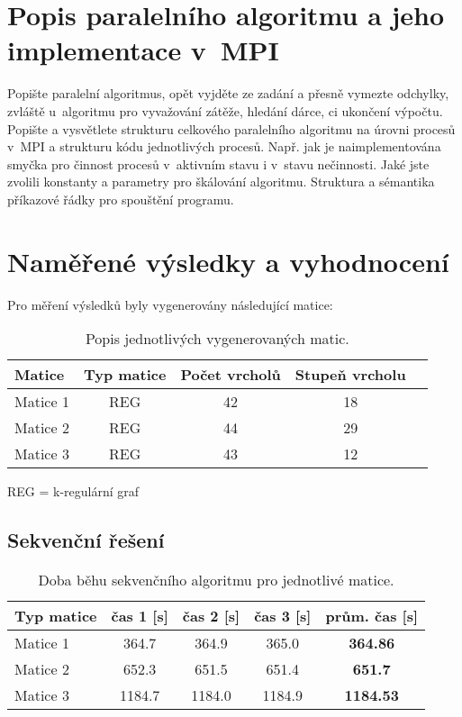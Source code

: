 \documentclass[12pt]{article}
\begin{document}
\section{Popis paralelního algoritmu a jeho implementace v~MPI}

Popište paralelní algoritmus, opět vyjděte ze zadání a přesně
vymezte odchylky, zvláště u~algoritmu pro vyvažování zátěže, hledání
dárce, ci ukončení výpočtu.  Popište a vysvětlete strukturu
celkového paralelního algoritmu na úrovni procesů v~MPI a strukturu
kódu jednotlivých procesů. Např. jak je naimplementována smyčka pro
činnost procesů v~aktivním stavu i v~stavu nečinnosti. Jaké jste
zvolili konstanty a parametry pro škálování algoritmu. Struktura a
sémantika příkazové řádky pro spouštění programu.

\section{Naměřené výsledky a vyhodnocení}

Pro měření výsledků byly vygenerovány následující matice:
\begin{table}[ht]
\centering
\begin{tabular}{|l|c|c|c|c|}
\hline \textbf{Matice} & \textbf{Typ matice} & \textbf{Počet vrcholů} & \textbf{Stupeň vrcholu} \\
\hline 
\hline Matice 1 & REG & 42 & 18 \\ 
\hline Matice 2 & REG & 44 & 29 \\ 
\hline Matice 3 & REG & 43 & 12 \\ 
\hline 
\end{tabular}
\caption{Popis jednotlivých vygenerovaných matic.}
\label{matice_popis}	
\end{table}

REG = k-regulární graf

\subsection{Sekvenční řešení}

\begin{table}[ht]
\centering
\begin{tabular}{|l|c|c|c|c|}
\hline \textbf{Typ matice} & \textbf{čas 1 [s]} & \textbf{čas 2 [s]} & \textbf{čas 3 [s]} & \textbf{prům. čas [s]} \\
\hline 
\hline Matice 1 & 364.7 & 364.9 & 365.0 & \textbf{364.86} \\ 
\hline Matice 2 & 652.3 & 651.5 & 651.4 & \textbf{651.7} \\ 
\hline Matice 3 & 1184.7 & 1184.0 & 1184.9 & \textbf{1184.53} \\ 
\hline 
\end{tabular}
\caption{Doba běhu sekvenčního algoritmu pro jednotlivé matice.}
\label{doba_behu_sekvencne}	
\end{table}
\end{document}
